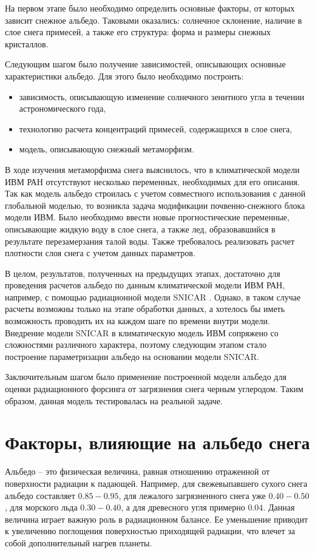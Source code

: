 \documentclass[a4paper, fontsize=14pt]{scrartcl}
\begin{document}
На первом этапе было необходимо определить основные факторы, от которых зависит снежное альбедо. Таковыми оказались: солнечное склонение, наличие в слое снега примесей, а также его структура: форма и размеры снежных кристаллов.

Следующим шагом было получение зависимостей, описывающих основные характеристики альбедо. Для этого было необходимо построить:
\begin{itemize}
    \item зависимость, описывающую изменение солнечного зенитного угла в течении астрономического года,
        \item технологию расчета концентраций примесей, содержащихся в слое снега,
        \item модель, описывающую снежный метаморфизм.
\end{itemize} 

В ходе изучения метаморфизма снега выяснилось, что в климатической модели ИВМ РАН отсутствуют несколько переменных, необходимых для его описания. Так как модель альбедо строилась с учетом совместного использования с данной глобальной моделью, то возникла задача модификации почвенно-снежного блока модели ИВМ. Было необходимо ввести новые прогностические переменные, описывающие жидкую воду в слое снега, а также лед, образовавшийся в результате перезамерзания талой воды. Также требовалось реализовать расчет плотности слоя снега с учетом данных параметров.

В целом, результатов, полученных на предыдущих этапах, достаточно для проведения расчетов альбедо по данным климатической модели ИВМ РАН, например, с помощью радиационной модели SNICAR \cite{Flanner2007}. Однако, в таком случае расчеты возможны только на этапе обработки данных, а хотелось бы иметь возможность проводить их на каждом шаге по времени внутри модели. Внедрение модели SNICAR в климатическую модель ИВМ сопряжено со сложностями различного характера, поэтому следующим этапом стало построение параметризации альбедо на основании модели SNICAR. 

Заключительным шагом было применение построенной модели альбедо для оценки радиационного форсинга от загрязнения снега черным углеродом. Таким образом, данная модель тестировалась на реальной задаче. 


\newpage
\section{Факторы, влияющие на альбедо снега}
Альбедо -- это физическая величина, равная отношению отраженной от поверхности радиации к падающей. Например, для свежевыпавшего сухого снега альбедо составляет $0.85-0.95$, для лежалого загрязненного снега уже $0.40-0.50$, для морского льда $0.30-0.40$, а для древесного угля примерно $0.04$. Данная величина играет важную роль в радиационном балансе. Ее уменьшение приводит к увеличению поглощения поверхностью приходящей радиации, что влечет за собой дополнительный нагрев планеты. 
\end{document}
